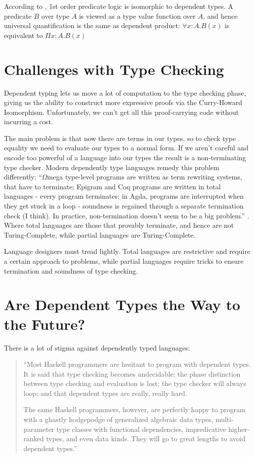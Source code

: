According to \cite{attapl}, 1st order predicate logic is isomorphic to dependent types. A predicate $B$ over type $A$ is viewed as a type value function over $A$, and hence universal quantification is the same as dependent product: $\forall x : A . B(x) $ is equivalent to $\Pi x : A . B(x) $


\section{Challenges with Type Checking}
Dependent typing lets us move a lot of computation to the type checking phase, giving us the ability to construct more expressive proofs via the Curry-Howard Isomorphism. Unfortunately, we can't get all this proof-carrying code without incurring a cost.

The main problem is that now there are terms in our types, so to check type equality we need to evaluate our types to a normal form. If we aren't careful and encode too powerful of a language into our types the result is a non-terminating type checker. Modern dependently type languages remedy this problem differently: ``$\Omega$mega type-level programs are written as term rewriting systems, that have to terminate; Epigram and Coq programs are written in total languages - every program terminates; in Agda, programs are interrupted when they get stuck in a loop - soundness is regained through a separate termination check (I think). In practice, non-termination doesn't seem to be a big problem.'' \cite{eval}. Where total languages are those that provably terminate, and hence are not Turing-Complete, while partial languages are Turing-Complete.

Language designers must tread lightly. Total languages are restrictive and require a certain approach to problems, while partial languages require tricks to ensure termination and soundness of type checking.

\section{Are Dependent Types the Way to the Future?}
There is a lot of stigma against dependently typed languages:

\begin{quote}
``Most Haskell programmers are hesitant to program with dependent types. It is said that type checking becomes undecidable; the phase distinction between type checking and evaluation is lost; the type checker will always loop; and that dependent types are really, really hard.

The same Haskell programmers, however, are perfectly happy to program with a ghastly hodgepodge of generalized algebraic data types, multi-parameter type classes with functional dependencies, impredicative higher-ranked types, and even data kinds. They will go to great lengths to avoid dependent types.'' \cite{lambdaPi}
\end{quote}

